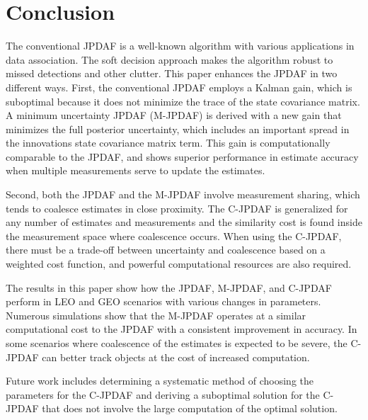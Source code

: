 \section{Conclusion}
\label{sec:Conclusion}
The conventional JPDAF is a well-known algorithm with various applications in data association.
The soft decision approach makes the algorithm robust to missed detections and other clutter.
This paper enhances the JPDAF in two different ways.
First, the conventional JPDAF employs a Kalman gain, which is suboptimal because it does not minimize the trace of the state covariance matrix.
A minimum uncertainty JPDAF (M-JPDAF) is derived with a new gain that minimizes the full posterior uncertainty, which includes an important spread in the innovations state covariance matrix term.
This gain is computationally comparable to the JPDAF, and shows superior performance in estimate accuracy when multiple measurements serve to update the estimates.

Second, both the JPDAF and the M-JPDAF involve measurement sharing, which tends to coalesce estimates in close proximity.
The C-JPDAF is generalized for any number of estimates and measurements and the similarity cost is found inside the measurement space where coalescence occurs.
When using the C-JPDAF, there must be a trade-off between uncertainty and coalescence based on a weighted cost function, and powerful computational resources are also required.

The results in this paper show how the JPDAF, M-JPDAF, and C-JPDAF perform in LEO and GEO scenarios with various changes in parameters.
Numerous simulations show that the M-JPDAF operates at a similar computational cost to the JPDAF with a consistent improvement in accuracy.
In some scenarios where coalescence of the estimates is expected to be severe, the C-JPDAF can better track objects at the cost of increased computation.

Future work includes determining a systematic method of choosing the parameters for the C-JPDAF and deriving a suboptimal solution for the C-JPDAF that does not involve the large computation of the optimal solution.



